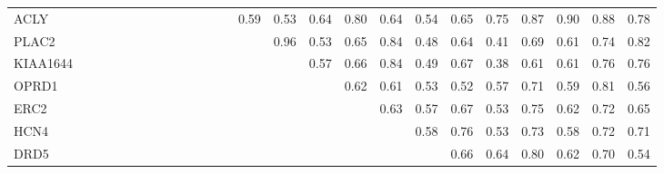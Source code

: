 \begin{longtable}{lrrrrrrrrrrrrrrrrrrrrrrrr}
ACLY     &             &             &             &              &             &              &              &               &             &             &            &            &        0.59 &           0.53 &        0.64 &       0.80 &       0.64 &       0.54 &        0.65 &          0.75 &       0.87 &       0.90 &       0.88 &          0.78 \\
PLAC2    &             &             &             &              &             &              &              &               &             &             &            &            &             &           0.96 &        0.53 &       0.65 &       0.84 &       0.48 &        0.64 &          0.41 &       0.69 &       0.61 &       0.74 &          0.82 \\
KIAA1644 &             &             &             &              &             &              &              &               &             &             &            &            &             &                &        0.57 &       0.66 &       0.84 &       0.49 &        0.67 &          0.38 &       0.61 &       0.61 &       0.76 &          0.76 \\
OPRD1    &             &             &             &              &             &              &              &               &             &             &            &            &             &                &             &       0.62 &       0.61 &       0.53 &        0.52 &          0.57 &       0.71 &       0.59 &       0.81 &          0.56 \\
ERC2     &             &             &             &              &             &              &              &               &             &             &            &            &             &                &             &            &       0.63 &       0.57 &        0.67 &          0.53 &       0.75 &       0.62 &       0.72 &          0.65 \\
HCN4     &             &             &             &              &             &              &              &               &             &             &            &            &             &                &             &            &            &       0.58 &        0.76 &          0.53 &       0.73 &       0.58 &       0.72 &          0.71 \\
DRD5     &             &             &             &              &             &              &              &               &             &             &            &            &             &                &             &            &            &            &        0.66 &          0.64 &       0.80 &       0.62 &       0.70 &          0.54 \\

\end{longtable}
